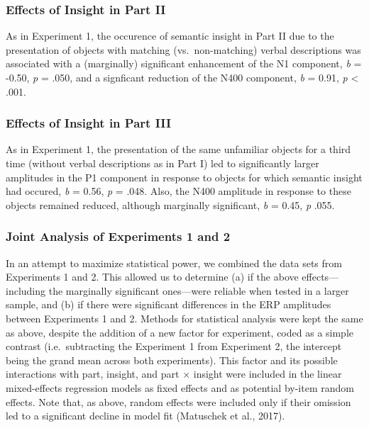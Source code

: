 \documentclass[
  english,
  man,11pt,floatsintext]{apa7}
\begin{document}
\hypertarget{effects-of-insight-in-part-ii-1}{%
\subsubsection{Effects of Insight in Part II}\label{effects-of-insight-in-part-ii-1}}

As in Experiment 1, the occurence of semantic insight in Part II due to the presentation of objects with matching (vs.~non-matching) verbal descriptions was associated with a (marginally) significant enhancement of the N1 component, \emph{b} = -0.50, \emph{p} = .050, and a signficant reduction of the N400 component, \emph{b} = 0.91, \emph{p} \textless{} .001.

\hypertarget{effects-of-insight-in-part-iii-1}{%
\subsubsection{Effects of Insight in Part III}\label{effects-of-insight-in-part-iii-1}}

As in Experiment 1, the presentation of the same unfamiliar objects for a third time (without verbal descriptions as in Part I) led to significantly larger amplitudes in the P1 component in response to objects for which semantic insight had occured, \emph{b} = 0.56, \emph{p} = .048. Also, the N400 amplitude in response to these objects remained reduced, although marginally significant, \emph{b} = 0.45, \emph{p} .055.

\hypertarget{joint-analysis-of-experiments-1-and-2}{%
\subsubsection{Joint Analysis of Experiments 1 and 2}\label{joint-analysis-of-experiments-1-and-2}}

In an attempt to maximize statistical power, we combined the data sets from Experiments 1 and 2. This allowed us to determine (a) if the above effects---including the marginally significant ones---were reliable when tested in a larger sample, and (b) if there were significant differences in the ERP amplitudes between Experiments 1 and 2. Methods for statistical analysis were kept the same as above, despite the addition of a new factor for experiment, coded as a simple contrast (i.e.~subtracting the Experiment 1 from Experiment 2, the intercept being the grand mean across both experiments). This factor and its possible interactions with part, insight, and part × insight were included in the linear mixed-effects regression models as fixed effects and as potential by-item random effects. Note that, as above, random effects were included only if their omission led to a significant decline in model fit (Matuschek et al., 2017).
\end{document}
